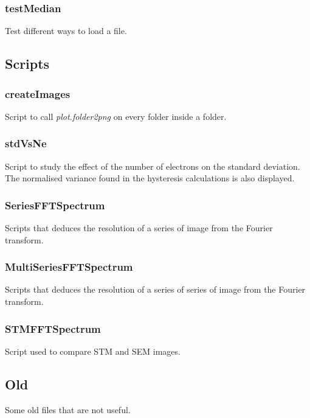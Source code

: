 \subsubsection{testMedian}
Test different ways to load a file.

\subsection{Scripts}

\subsubsection{createImages}
Script to call \emph{plot.folder2png} on every folder inside a folder.

\subsubsection{stdVsNe}
Script to study the effect of the number of electrons on the standard deviation. The normalised variance found in the hysteresis calculations is also displayed.

\subsubsection{SeriesFFTSpectrum}
Scripts that deduces the resolution of a series of image from the Fourier transform.

\subsubsection{MultiSeriesFFTSpectrum}
Scripts that deduces the resolution of a series of series of image from the Fourier transform.

\subsubsection{STMFFTSpectrum}
Script used to compare STM and SEM images.

\subsection{Old}
Some old files that are not useful.

